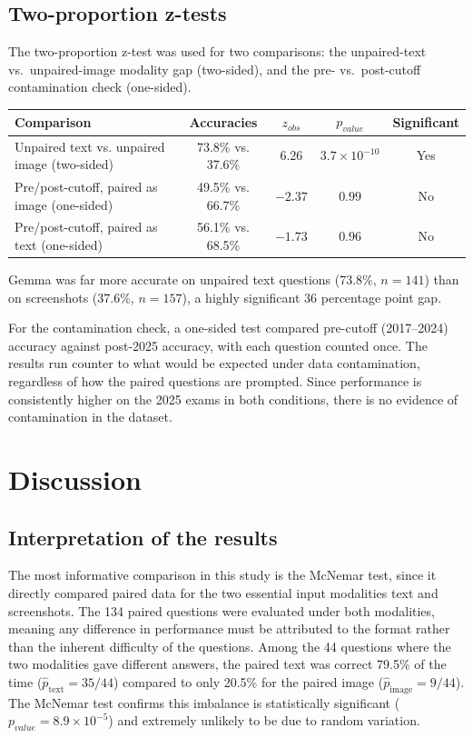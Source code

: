 \documentclass{article}
\begin{document}
\subsection{Two-proportion z-tests}

The two-proportion z-test was used for two comparisons: the unpaired-text vs.\ unpaired-image modality gap (two-sided), and the pre- vs.\ post-cutoff contamination check (one-sided).

\begin{center}
\begin{tabular}{lcccc}
\toprule
\textbf{Comparison} & \textbf{Accuracies} & \textbf{$z_{obs}$} & \textbf{$p_{value}$} & \textbf{Significant} \\
\midrule
Unpaired text vs. unpaired image (two-sided) & 73.8\% vs. 37.6\% & $6.26$  & $3.7 \times 10^{-10}$ & Yes \\
Pre/post-cutoff, paired as image (one-sided) & 49.5\% vs. 66.7\% & $-2.37$ & $0.99$ & No \\
Pre/post-cutoff, paired as text (one-sided)  & 56.1\% vs. 68.5\% & $-1.73$ & $0.96$ & No \\
\bottomrule
\end{tabular}
\end{center}

\vspace{2ex}

Gemma was far more accurate on unpaired text questions (73.8\%, $n = 141$) than on screenshots (37.6\%, $n = 157$), a highly significant 36 percentage point gap.

For the contamination check, a one-sided test compared pre-cutoff (2017--2024) accuracy against post-2025 accuracy, with each question counted once. The results run counter to what would be expected under data contamination, regardless of how the paired questions are prompted. Since performance is consistently higher on the 2025 exams in both conditions, there is no evidence of contamination in the dataset.

\section{Discussion}

\subsection{Interpretation of the results}

The most informative comparison in this study is the McNemar test, since it directly compared paired data for the two essential input modalities text and screenshots. The 134 
paired questions were evaluated under both modalities, meaning any difference in 
performance must be attributed to the format rather than the inherent difficulty 
of the questions. Among the 44 questions where the two modalities gave different 
answers, the paired text was correct 79.5\% of the time 
($\hat{p}_\text{text} = 35/44$) compared to only 20.5\% for the paired image
($\hat{p}_\text{image} = 9/44$). The McNemar test confirms this imbalance is 
statistically significant ($p_{value} = 8.9 \times 10^{-5}$) and extremely unlikely to be due to random variation.
\end{document}
